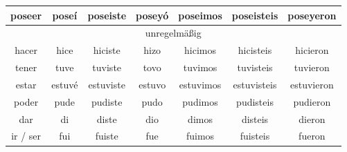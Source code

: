 \begin{tabular}{ccccccc}
poseer & poseí & poseiste & poseyó & poseimos & poseisteis & poseyeron \\
\hline
\multicolumn{7}{c}{unregelmäßig} \\
\hline
hacer & hice & hiciste & hizo & hicimos & hicisteis & hicieron \\
tener & tuve & tuviste & tovo & tuvimos & tuvisteis & tuvieron \\
estar & estuvé & estuviste & estuvo & estuvimos & estuvisteis & estuvieron \\
poder & pude & pudiste & pudo & pudimos & pudisteis & pudieron \\
dar & di & diste & dio & dimos & disteis & dieron \\
ir / ser & fui & fuiste & fue & fuimos & fuisteis & fueron \\
\hline
\end{tabular}

